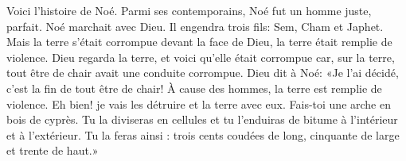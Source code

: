 Voici l’histoire de Noé.
Parmi ses contemporains, Noé fut un homme juste, parfait.
	Noé marchait avec Dieu.
Il engendra trois fils: Sem, Cham et Japhet.
Mais la terre s’était corrompue devant la face de Dieu,
	la terre était remplie de violence.
Dieu regarda la terre, et voici qu’elle était corrompue
	car, sur la terre, tout être de chair avait une conduite corrompue.
Dieu dit à Noé: «Je l’ai décidé, c’est la fin de tout être de chair!
	À cause des hommes, la terre est remplie de violence.
	Eh bien! je vais les détruire et la terre avec eux.
Fais-toi une arche en bois de cyprès.
	Tu la diviseras en cellules et tu l’enduiras de bitume
	à l’intérieur et à l’extérieur.
Tu la feras ainsi :
	trois cents coudées de long, cinquante de large et trente de haut.»
